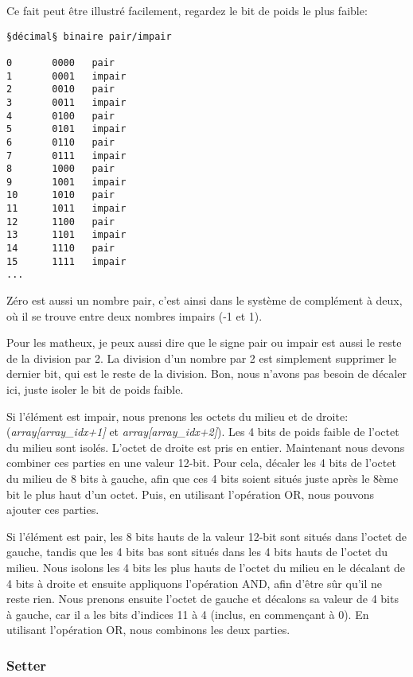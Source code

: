 Ce fait peut être illustré facilement, regardez le bit de poids le plus faible:

\begin{lstlisting}
§décimal§ binaire pair/impair

0       0000   pair
1       0001   impair
2       0010   pair
3       0011   impair
4       0100   pair
5       0101   impair
6       0110   pair
7       0111   impair
8       1000   pair
9       1001   impair
10      1010   pair
11      1011   impair
12      1100   pair
13      1101   impair
14      1110   pair
15      1111   impair
...
\end{lstlisting}

Zéro est aussi un nombre pair, c'est ainsi dans le système de complément à deux,
où il se trouve entre deux nombres impairs (-1 et 1).

Pour les matheux, je peux aussi dire que le signe pair ou impair est aussi le
reste de la division par 2.
La division d'un nombre par 2 est simplement supprimer le dernier bit, qui est le
reste de la division.
Bon, nous n'avons pas besoin de décaler ici, juste isoler le bit de poids faible.

Si l'élément est impair, nous prenons les octets du milieu et de droite:\\ (\emph{array[array\_idx+1]}
et \emph{array[array\_idx+2]}).
Les 4 bits de poids faible de l'octet du milieu sont isolés.
L'octet de droite est pris en entier.
Maintenant nous devons combiner ces parties en une valeur 12-bit.
Pour cela, décaler les 4 bits de l'octet du milieu de 8 bits à gauche, afin que ces
4 bits soient situés juste après le 8ème bit le plus haut d'un octet.
Puis, en utilisant l'opération OR, nous pouvons ajouter ces parties.

Si l'élément est pair, les 8 bits hauts de la valeur 12-bit sont situés dans l'octet
de gauche, tandis que les 4 bits bas sont situés dans les 4 bits hauts de l'octet
du milieu.
Nous isolons les 4 bits les plus hauts de l'octet du milieu en le décalant de 4 bits
à droite et ensuite appliquons l'opération AND, afin d'être sûr qu'il ne reste rien.
Nous prenons ensuite l'octet de gauche et décalons sa valeur de 4 bits à gauche,
car il a les bits d'indices 11 à 4 (inclus, en commençant à 0).
En utilisant l'opération OR, nous combinons les deux parties.

\subsubsection{Setter}

